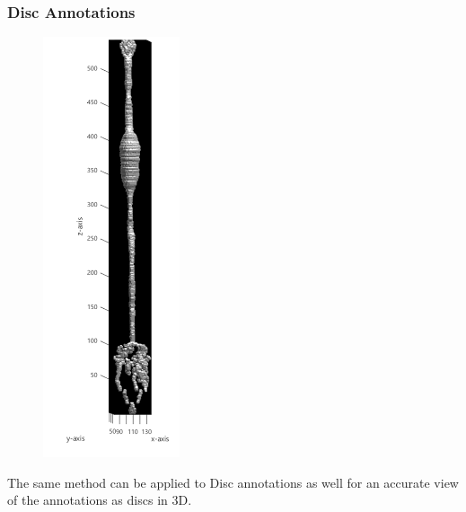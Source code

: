 \documentclass[12pt]{exam}
\begin{document}
	\subsubsection{Disc Annotations}
	\begin{figure}
		\includegraphics[width=\linewidth]{discBC}
		\label{discBC}
	\end{figure} 
	The same method can be applied to Disc annotations as well for an accurate view of the annotations as discs in 3D. 
	
\end{document}
